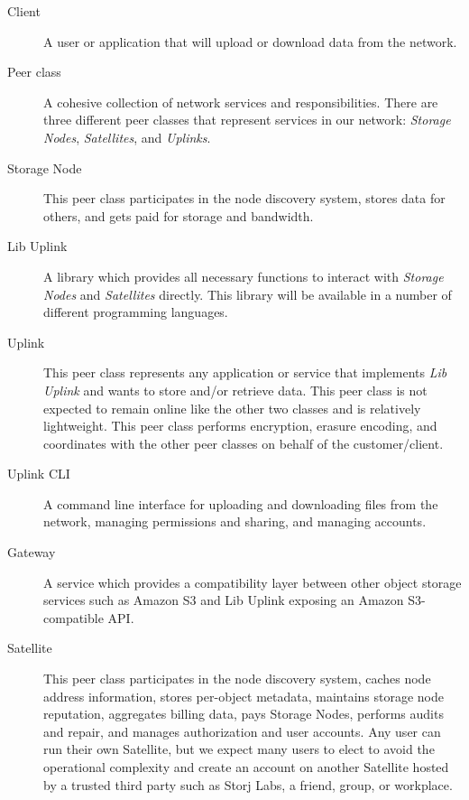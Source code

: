 \documentclass[8pt,fleqn,openany]{book}
\begin{document}
\begin{description}
\item[Client] A user or application that will upload or download data from the network.

\item[Peer class] A cohesive collection of network services and
  responsibilities. There are three different peer classes that represent
  services in our network: {\em Storage Nodes}, {\em Satellites}, and {\em Uplinks}.

\item[Storage Node] This peer class participates in the node discovery
  system, stores data for others, and gets paid for storage and bandwidth.

\item[Lib Uplink] A library which provides all necessary functions to interact with {\em Storage Nodes} and {\em Satellites} directly. This library will be available in a number of different programming languages.

\item[Uplink] This peer class represents any application or
  service that implements {\em Lib Uplink} and wants to store and/or retrieve data. This peer class
  is not expected to remain online like the other two classes and is
  relatively lightweight. This peer class performs encryption, erasure encoding,
  and coordinates with the other peer classes on behalf of the customer/client.

\item[Uplink CLI] A command line interface for uploading and downloading files from the network, managing permissions and sharing, and managing accounts.

\item[Gateway] A service which provides a compatibility layer between other object storage services such as Amazon S3 and Lib Uplink exposing an Amazon S3-compatible API.

\item[Satellite] This peer class participates in the node discovery system,
  caches node address information, stores per-object metadata, maintains storage
  node reputation, aggregates billing data, pays Storage Nodes, performs audits and repair, and manages
  authorization and user accounts.
  Any user can run their own Satellite, but we expect many users
  to elect to avoid the operational complexity and create an account on
  another Satellite hosted by a trusted third party such as Storj Labs,
  a friend, group, or workplace.

\end{description}
\end{document}
